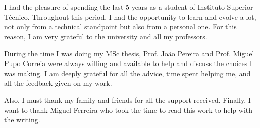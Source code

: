 
\section*{\acknowledgments}

I had the pleasure of spending the last 5 years as a student of Instituto Superior Técnico. Throughout this period, I had the opportunity to learn and evolve a lot, not only from a technical standpoint but also from a personal one. For this reason, I am very grateful to the university and all my professors.

During the time I was doing my MSc thesis, Prof. João Pereira and Prof. Miguel Pupo Correia were always willing and available to help and discuss the choices I was making. I am deeply grateful for all the advice, time spent helping me, and all the feedback given on my work. 

Also, I must thank my family and friends for all the support received. Finally, I want to thank Miguel Ferreira who took the time to read this work to help with the writing.

